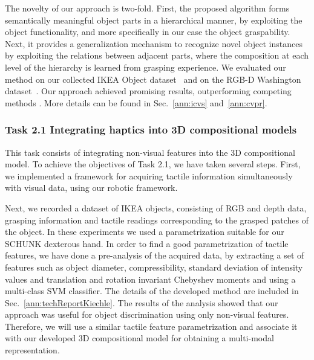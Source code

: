 \documentclass[a4paper,11pt,pdf]{pacmanreport}
\begin{document}
The novelty of our approach is two-fold. First, the proposed algorithm forms semantically meaningful object parts in a hierarchical manner, by exploiting the object functionality, and more specifically in our case the object graspability. Next, it provides a generalization mechanism to recognize novel object instances by exploiting the relations between adjacent parts, where the composition at each level of the hierarchy is learned from grasping experience. We evaluated our method on our collected IKEA Object dataset~\cite{website} and on the RGB-D Washington dataset~\cite{rgbd-dataset}. Our approach achieved promising results, outperforming competing methods \cite{rel7}.
More details can be found in Sec.~\ref{ann:icvs} and~\ref{ann:cvpr}. %


\subsubsection{Task 2.1 Integrating haptics into 3D compositional models}

This task consists of integrating non-visual features into the 3D 
compositional model. To achieve the objectives of Task 2.1, we have taken several steps. First, we implemented a framework for acquiring tactile information simultaneously with visual data, using our robotic framework. 

Next, we recorded a dataset of IKEA objects, consisting of RGB and depth data, grasping information and tactile readings corresponding to the grasped patches of the object. In these experiments we used a parametrization suitable for our SCHUNK dexterous hand. In order to find a good parametrization of tactile features, we have done a pre-analysis of the acquired data, by extracting a set of features such as object diameter, compressibility, standard deviation of intensity values 
and translation and rotation invariant Chebyshev moments and using a multi-class SVM classifier. The details of the developed method are included in Sec.~\ref{ann:techReportKiechle}. The results of the analysis showed that our approach was useful for object discrimination using only non-visual features. Therefore, we will use a similar tactile feature parametrization and associate it with our developed 3D compositional model for obtaining a multi-modal representation.
\end{document}
